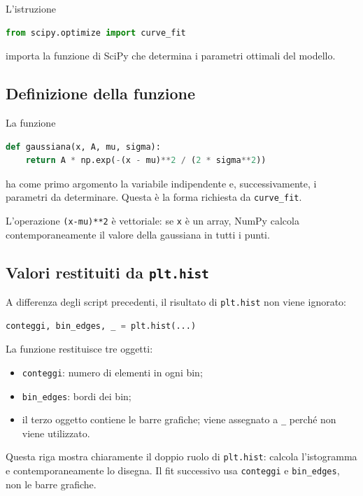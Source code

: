 L'istruzione

\begin{lstlisting}[language=Python]
from scipy.optimize import curve_fit
\end{lstlisting}

importa la funzione di SciPy che determina i parametri ottimali del
modello.

\subsection{Definizione della funzione}

La funzione

\begin{lstlisting}[language=Python]
def gaussiana(x, A, mu, sigma):
    return A * np.exp(-(x - mu)**2 / (2 * sigma**2))
\end{lstlisting}

ha come primo argomento la variabile indipendente e, successivamente, i
parametri da determinare. Questa è la forma richiesta da
\texttt{curve\_fit}.

L'operazione \texttt{(x-mu)**2} è vettoriale: se \texttt{x} è un array,
NumPy calcola contemporaneamente il valore della gaussiana in tutti i
punti.

\subsection{Valori restituiti da \texttt{plt.hist}}

A differenza degli script precedenti, il risultato di \texttt{plt.hist}
non viene ignorato:

\begin{lstlisting}[language=Python]
conteggi, bin_edges, _ = plt.hist(...)
\end{lstlisting}

La funzione restituisce tre oggetti:

\begin{itemize}
    \item \texttt{conteggi}: numero di elementi in ogni bin;
    \item \texttt{bin\_edges}: bordi dei bin;
    \item il terzo oggetto contiene le barre grafiche; viene assegnato a
          \texttt{\_} perché non viene utilizzato.
\end{itemize}

Questa riga mostra chiaramente il doppio ruolo di \texttt{plt.hist}:
calcola l'istogramma e contemporaneamente lo disegna. Il fit successivo
usa \texttt{conteggi} e \texttt{bin\_edges}, non le barre grafiche.

